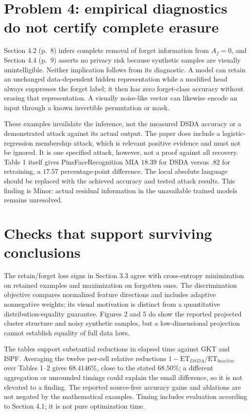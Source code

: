 \documentclass[10pt]{article}
\begin{document}
\section*{Problem 4: empirical diagnostics do not certify complete erasure}
Section 4.2 (p. 8) infers complete removal of forget information from \(A_f=0\), and Section 4.4 (p. 9) asserts no privacy risk because synthetic samples are visually unintelligible. Neither implication follows from its diagnostic. A model can retain an unchanged data-dependent hidden representation while a modified head always suppresses the forget label; it then has zero forget-class accuracy without erasing that representation. A visually noise-like vector can likewise encode an input through a known invertible permutation or mask.\par
These examples invalidate the inference, not the measured DSDA accuracy or a demonstrated attack against its actual output. The paper does include a logistic-regression membership attack, which is relevant positive evidence and must not be ignored. It is one specified attack, however, not a proof against all recovery. Table 1 itself gives PinsFaceRecognition MIA \(18.39\) for DSDA versus \(.82\) for retraining, a \(17.57\) percentage-point difference. The local absolute language should be replaced with the achieved accuracy and tested attack results. This finding is Minor: actual residual information in the unavailable trained models remains unresolved.\par
\section*{Checks that support surviving conclusions}
The retain/forget loss signs in Section 3.3 agree with cross-entropy minimization on retained examples and maximization on forgotten ones. The discrimination objective compares normalized feature directions and includes adaptive nonnegative weights; its visual motivation is distinct from a quantitative distribution-equality guarantee. Figures 2 and 5 do show the reported projected cluster structure and noisy synthetic samples, but a low-dimensional projection cannot establish equality of full data laws.\par
The tables support substantial reductions in elapsed time against GKT and ISPF. Averaging the twelve per-cell relative reductions \(1-\mathrm{ET}_{DSDA}/\mathrm{ET}_{baseline}\) over Tables 1–2 gives \(68.4146\%\), close to the stated \(68.50\%\); a different aggregation or unrounded timings could explain the small difference, so it is not elevated to a finding. The reported source-free accuracy gains and ablations are not negated by the mathematical examples. Timing includes evaluation according to Section 4.1; it is not pure optimization time.\par
\end{document}
